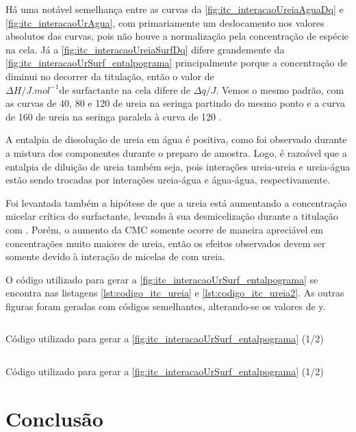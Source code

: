 	Há uma notável semelhança entre as curvas da \autoref{fig:itc_interacaoUreiaAguaDq} e \autoref{fig:itc_interacaoUrAgua}, com primariamente um deslocamento nos valores absolutos das curvas, pois não houve a normalização pela concentração de espécie na cela. Já a \autoref{fig:itc_interacaoUreiaSurfDq} difere grandemente da \autoref{fig:itc_interacaoUrSurf_entalpograma} principalmente porque a concentração de \TTAB{} diminui no decorrer da titulação, então o valor de \(\Delta H/J.mol^{-1} \text{de surfactante na cela}\) difere de \(\Delta q/J\). Vemos o mesmo padrão, com as curvas de 40, 80 e 120 \mM{} de ureia na seringa partindo do mesmo ponto e a curva de 160 \mM{} de ureia na seringa paralela à curva de 120 \mM.
	
	A entalpia de dissolução de ureia em água é positiva, como foi observado durante a mistura dos componentes durante o preparo de amostra. Logo, é razoável que a entalpia de diluição de ureia também seja, pois interações ureia-ureia e ureia-água estão sendo trocadas por interações ureia-água e água-água, respectivamente.
	
	Foi levantada também a hipótese de que a ureia está aumentando a concentração micelar crítica do surfactante, levando à sua desmicelização durante a titulação com \TTAB{}. Porém, o aumento da CMC somente ocorre de maneira apreciável em concentrações muito maiores de ureia, então os efeitos observados devem ser somente devido à interação de micelas de \TTAB{} com ureia.
	
	O código utilizado para gerar a \autoref{fig:itc_interacaoUrSurf_entalpograma} se encontra nas listagens \ref{lst:codigo_itc_ureia} e \ref{lst:codigo_itc_ureia2}. As outras figuras foram geradas com códigos semelhantes, alterando-se os valores de y.
	
	\begin{listing}[h]
		\inputminted{python}{./python/ITC_tratamento_ureia_ttab.py}
		\caption{Código utilizado para gerar a \autoref{fig:itc_interacaoUrSurf_entalpograma} (1/2)}
		\label{lst:codigo_itc_ureia}
	\end{listing}

	\begin{listing}[h]
		\inputminted{python}{./python/ITC_tratamento_ureia_ttab2.py}
		\caption{Código utilizado para gerar a \autoref{fig:itc_interacaoUrSurf_entalpograma} (1/2)}
		\label{lst:codigo_itc_ureia2}
	\end{listing}


	\FloatBarrier
	
	\section{Conclusão}
	

